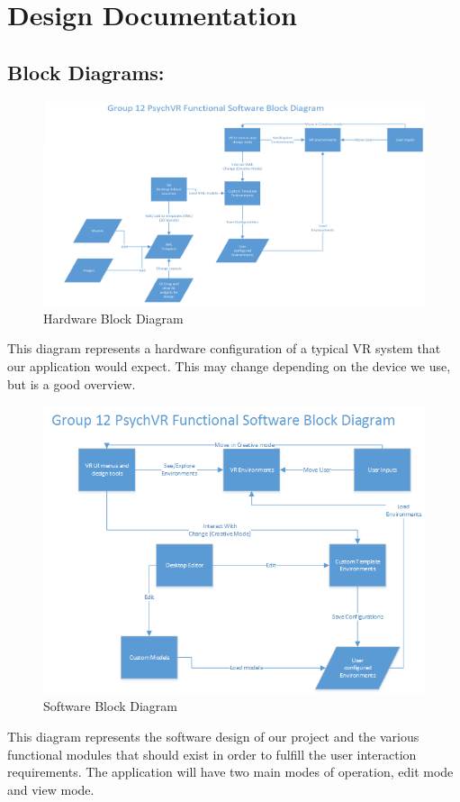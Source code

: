 \documentclass[a4paper,10pt]{article}
\begin{document}
\pagebreak
\section{Design Documentation}
	\subsection{Block Diagrams:}
	\begin{figure}[H]
	\includegraphics[width=\linewidth,height=\paperheight,keepaspectratio]{HardwareConfig.png}
	\caption{Hardware Block Diagram}
	\label{fig:hblock}
	\end{figure}
	This diagram represents a hardware configuration of a typical VR system that our application would expect. This may change depending on the device we use, but is a good overview.
	\pagebreak
	\begin{figure}[H]
	\includegraphics[width=\linewidth,height=\paperheight,keepaspectratio]{SoftwareConfig.png}
	\caption{Software Block Diagram}
	\label{fig:sblock}
	\end{figure}
	This diagram represents the software design of our project and the various functional modules that should exist in order to fulfill the user interaction requirements. 
	The application will have two main modes of operation, edit mode and view mode. 
\end{document}
